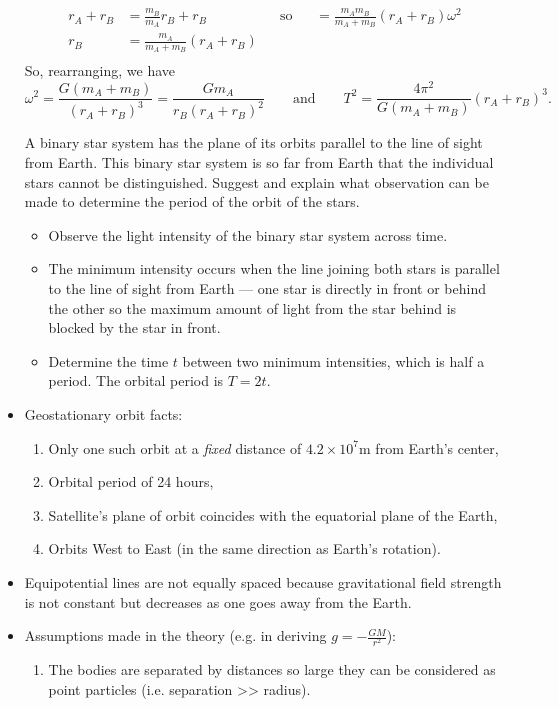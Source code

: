 \begin{itemize}[label=\(\square\)]
\begin{align*}
    r_A+r_B&=\frac{m_B}{m_A}r_B+r_B& &\text{so}& &=\frac{m_Am_B}{m_A+m_B}(r_A+r_B)\omega^2\\
    r_B&=\frac{m_A}{m_A+m_B}(r_A+r_B)& && &\\
\end{align*}
So, rearranging, we have
\[\omega^2=\frac{G(m_A+m_B)}{(r_A+r_B)^3}=\frac{Gm_A}{r_B(r_A+r_B)^2} \qquad\text{and}\qquad T^2=\frac{4\pi^2}{G(m_A+m_B)}(r_A+r_B)^3.\]
\begin{example}{}{}
    A binary star system has the plane of its orbits parallel to the line of sight from Earth. This binary star system is so far from Earth that the individual stars cannot be distinguished. Suggest and explain what observation can be made to determine the period of the orbit of the stars.
    \begin{itemize}
        \item Observe the light intensity of the binary star system across time.
        \item The minimum intensity occurs when the line joining both stars is parallel to the line of sight from Earth --- one star is directly in front or behind the other so the maximum amount of light from the star behind is blocked by the star in front. 
        \item Determine the time \(t\) between two minimum intensities, which is half a period. The orbital period is \(T=2t\). 
    \end{itemize}
\end{example}
\item Geostationary orbit facts:
\begin{enumerate}
    \item Only one such orbit at a \emph{fixed} distance of \(4.2\times10^7\text{m}\) from Earth's center,
    \item Orbital period of 24 hours,
    \item Satellite's plane of orbit coincides with the equatorial plane of the Earth,
    \item Orbits West to East (in the same direction as Earth's rotation). 
\end{enumerate}
\item Equipotential lines are not equally spaced because gravitational field strength is not constant but decreases as one goes away from the Earth.
\item Assumptions made in the theory (e.g. in deriving \(g=-\frac{GM}{r^2}\)):
\begin{enumerate}
    \item The bodies are separated by distances so large they can be considered as point particles (i.e. separation >> radius).

\end{enumerate}
\end{itemize}
